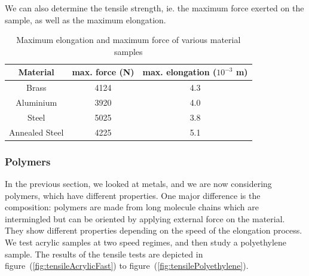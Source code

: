\documentclass{scrartcl}
\begin{document}
We can also determine the tensile strength, ie. the maximum force exerted on the sample, as well as the maximum elongation.

\begin{table}[!ht]
    \centering
    \begin{tabular}{c|c|c}
        Material & max. force (N) & max. elongation ($10^{-3}$ m) \\ \hline
        Brass & 4124 & 4.3 \\
        Aluminium & 3920 & 4.0 \\
        Steel & 5025 & 3.8 \\
        Annealed Steel & 4225 & 5.1 
    \end{tabular}
    \caption{Maximum elongation and maximum force of various material samples}
    \label{tab:tensile_maxForce_maxElongation}
\end{table}

\subsubsection{Polymers}

In the previous section, we looked at metals, and we are now considering polymers, which have different properties. One major difference is the composition: polymers are made from long molecule chains which are intermingled but can be oriented by applying external force on the material. They show different properties depending on the speed of the elongation process. We test acrylic samples at two speed regimes, and then study a polyethylene sample. The results of the tensile tests are depicted in figure~(\ref{fig:tensileAcrylicFast}) to figure~(\ref{fig:tensilePolyethylene}).
\end{document}
